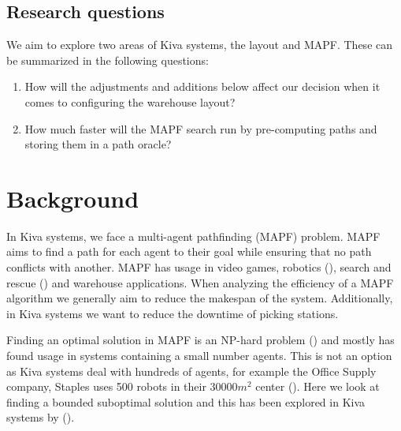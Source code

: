 \documentclass[a4paper,11pt]{article}
\begin{document}
\newpage
\subsection{Research questions}
We aim to explore two areas of Kiva systems, the layout and MAPF. These can be summarized in the following questions:

\begin{enumerate}
	\item How will the adjustments and additions below affect our decision when it comes to configuring the warehouse layout?

\item How much faster will the MAPF search run by pre-computing paths and storing them in a path oracle?
\end{enumerate}

\section{Background}
\label{background}

In Kiva systems, we face a multi-agent pathfinding (MAPF) problem. MAPF aims to find a path for each agent to their goal while ensuring that no path conflicts with another. MAPF has usage in video games, robotics (\cite{bennewitz2002finding}), search and rescue (\cite{konolige2006centibots}) and warehouse applications. When analyzing the efficiency of a MAPF algorithm we generally aim to reduce the makespan of the system. Additionally, in Kiva systems we want to reduce the downtime of picking stations.

Finding an optimal solution in MAPF is an NP-hard problem (\cite{yu2013structure}) and mostly has found usage in systems containing a small number agents. This is not an option as Kiva systems deal with hundreds of agents, for example the Office Supply company, Staples uses 500 robots in their $30000m^{2}$ center (\cite{guizzo2008three}). Here we look at finding a bounded suboptimal solution and this has been explored in Kiva systems by (\cite{cohen2016bounded}).
\end{document}
